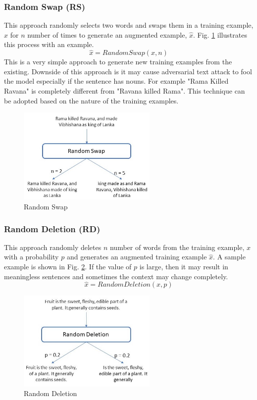 \documentclass{article}
\begin{document}
\subsubsection{Random Swap (RS)}
This approach randomly selects two words and swaps them in a training example, $x$ for $n$ number of times to generate an augmented example, $\hat{x}$. Fig. \ref{fig:randomswap} illustrates this process with an example. 
\begin{equation}
\hat{x} = RandomSwap(x, n)
\end{equation}
This is a very simple approach to generate new training examples from the existing. Downside of this approach is it may cause adversarial text attack to fool the model especially if the sentence has nouns. For example "Rama Killed Ravana" is completely different from "Ravana killed Rama". This technique can be adopted based on the nature of the training examples.

\begin{figure}[h!]
\centering
  \includegraphics[width=0.6\textwidth]{randomswap.jpg}
  \caption{Random Swap}
  \label{fig:randomswap}
\end{figure}

\subsubsection{Random Deletion (RD)}
This approach randomly deletes $n$ number of words from the training example, $x$ with a probability $p$ and generates an augmented training example $\hat{x}$. A sample example is shown in Fig. \ref{fig:randomdelete}. If the value of $p$ is large, then it may result in meaningless sentences and sometimes the context may change completely.
\begin{equation}
\hat{x} = RandomDeletion(x, p)
\end{equation}
\begin{figure}[h!]
\centering
  \includegraphics[width=0.6\textwidth]{randomdelete.jpg}
  \caption{Random Deletion}
  \label{fig:randomdelete}
\end{figure}
\end{document}
